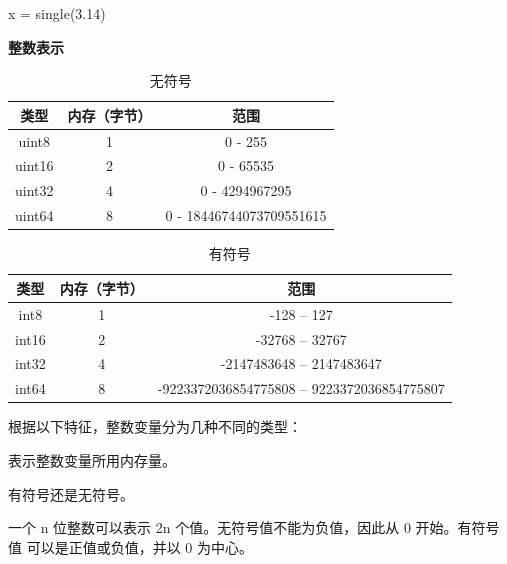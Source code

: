\documentclass[12pt,a4paper]{article}
\begin{document}
x = single(3.14)

\textbf{整数表示}

\begin{table}[htbp]
    \begin{center}
        \caption{无符号}
        \begin{tabular}{|c|c|c|}
            \hline
            \textbf{类型} & \textbf{内存（字节）} & \textbf{范围} \\
            \hline
            uint8  & 1 & 0 - 255 \\
            \hline
            uint16 & 2 & 0 - 65535 \\
            \hline
            uint32 & 4 & 0 - 4294967295 \\    
            \hline
            uint64 & 8 & 0 - 18446744073709551615 \\ 
            \hline        
        \end{tabular}
    \end{center}
\end{table}

\begin{table}[htbp]
    \begin{center}
        \caption{有符号}
        \begin{tabular}{|c|c|c|}
            \hline
            \textbf{类型} & \textbf{内存（字节）} & \textbf{范围} \\
            \hline
            int8  & 1 & -128 – 127 \\
            \hline
            int16 & 2 & -32768 – 32767 \\
            \hline
            int32 & 4 & -2147483648 – 2147483647 \\    
            \hline
            int64 & 8 & -9223372036854775808 – 9223372036854775807 \\ 
            \hline        
        \end{tabular}
    \end{center}
\end{table}

根据以下特征，整数变量分为几种不同的类型：

表示整数变量所用内存量。

有符号还是无符号。

一个 n 位整数可以表示 2n 个值。无符号值不能为负值，因此从 0 开始。有符号值
可以是正值或负值，并以 0 为中心。
\end{document}
